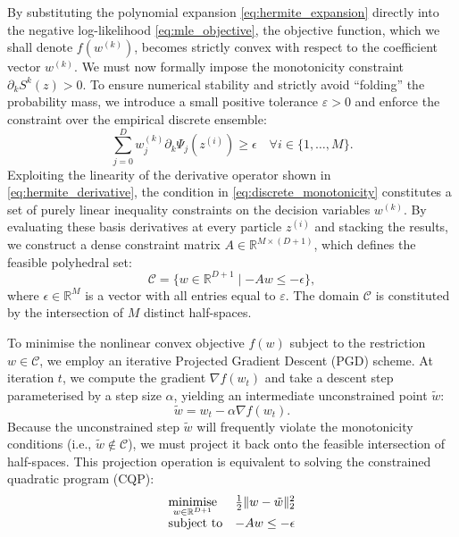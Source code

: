 By substituting the polynomial expansion \eqref{eq:hermite_expansion} directly into the negative log-likelihood \eqref{eq:mle_objective}, the objective function, which we shall denote $f(w^{(k)})$, becomes strictly convex with respect to the coefficient vector $w^{(k)}$. We must now formally impose the monotonicity constraint $\partial_k S^k(z) > 0$. To ensure numerical stability and strictly avoid ``folding'' the probability mass, we introduce a small positive tolerance $\varepsilon > 0$ and enforce the constraint over the empirical discrete ensemble:
\begin{equation}
    \sum_{j=0}^D w_j^{(k)} \partial_k \Psi_j(z^{(i)}) \ge \epsilon \quad \forall i \in \{1, \dots, M\}.
    \label{eq:discrete_monotonicity}
\end{equation}
Exploiting the linearity of the derivative operator shown in \eqref{eq:hermite_derivative}, the condition in \eqref{eq:discrete_monotonicity} constitutes a set of purely linear inequality constraints on the decision variables $w^{(k)}$. By evaluating these basis derivatives at every particle $z^{(i)}$ and stacking the results, we construct a dense constraint matrix $A \in \mathbb{R}^{M \times (D+1)}$, which defines the feasible polyhedral set:
\begin{equation*}
    \mathcal{C} = \{ w \in \mathbb{R}^{D+1} \mid -Aw \le -\epsilon \},
\end{equation*}
where $\epsilon \in \mathbb{R}^M$ is a vector with all entries equal to $\varepsilon$. The domain $\mathcal{C}$ is constituted by the intersection of $M$ distinct half-spaces.

To minimise the nonlinear convex objective $f(w)$ subject to the restriction $w \in \mathcal{C}$, we employ an iterative Projected Gradient Descent (PGD) scheme. At iteration $t$, we compute the gradient $\nabla f(w_t)$ and take a descent step parameterised by a step size $\alpha$, yielding an intermediate unconstrained point $\tilde{w}$:
\begin{equation*}
    \tilde{w} = w_t - \alpha \nabla f(w_t).
\end{equation*}
Because the unconstrained step $\tilde{w}$ will frequently violate the monotonicity conditions (i.e., $\tilde{w} \notin \mathcal{C}$), we must project it back onto the feasible intersection of half-spaces. This projection operation is equivalent to solving the constrained quadratic program (CQP):
\begin{equation}\label{eq:cqp_projection}
\begin{array}{ll}
    \displaystyle \operatorname*{minimise}_{w \in \mathbb{R}^{D+1}} & \frac{1}{2}\|w - \tilde{w}\|_2^2 \\
    \text{subject to} & -Aw \le -\epsilon
\end{array}
\end{equation}

